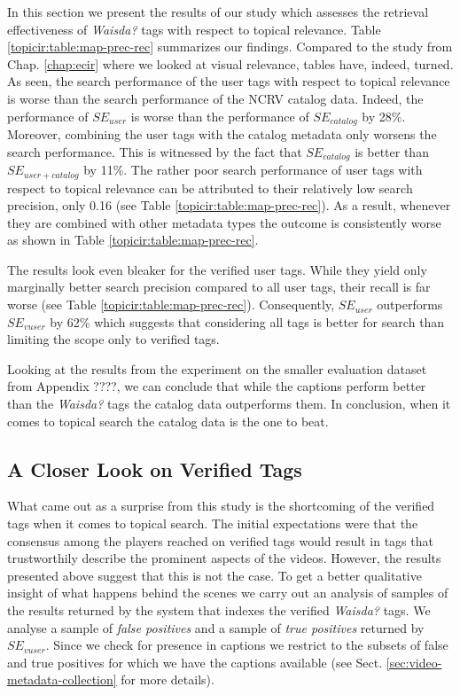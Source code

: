 In this section we present the results of our study which assesses the retrieval effectiveness of \textit{Waisda?} tags with respect to topical relevance. Table \ref{topicir:table:map-prec-rec} summarizes our findings. Compared to the study from Chap. \ref{chap:ecir} where we looked at visual relevance, tables have, indeed, turned. As seen, the search performance of the user tags with respect to topical relevance is  worse than the search performance of the NCRV catalog data. Indeed, the performance of $SE_{user}$ is worse than the performance of $SE_{catalog}$ by 28\%. Moreover, combining the user tags with the catalog metadata only worsens the search performance. This is witnessed by the fact that $SE_{catalog}$ is better than $SE_{user+catalog}$ by 11\%. 
The rather poor search performance of user tags with respect to topical relevance can be attributed to their relatively low search precision, only 0.16 (see Table \ref{topicir:table:map-prec-rec}). As a result, whenever they are combined with other metadata types the outcome is consistently worse as shown in Table \ref{topicir:table:map-prec-rec}.

The results look even bleaker for the verified user tags. While they yield only marginally better search precision compared to all user tags, their recall is far worse (see Table \ref{topicir:table:map-prec-rec}). Consequently, $SE_{user}$ outperforms $SE_{vuser}$ by 62\% which suggests that considering all tags is better for search than limiting the scope only to verified tags.

Looking at the results from the experiment on the smaller evaluation dataset from Appendix ????, we can conclude that while the captions perform better than the \textit{Waisda?} tags the catalog data outperforms them. In conclusion, when it comes to topical search the catalog data is the one to beat.

\subsection{A Closer Look on Verified Tags}\label{topicir:qual-ana}
What came out as a surprise from this study is the shortcoming of the verified tags when it comes to topical search. The initial expectations were that the consensus among the players reached on verified tags would result in tags that trustworthily describe the prominent aspects of the videos. However, the results presented above suggest that this is not the case.  To get a better qualitative insight of what happens behind the scenes we carry out an analysis of samples of the results returned by the system that indexes the verified \textit{Waisda?} tags. We analyse a sample of \textit{false positives} and a sample of \textit{true positives} returned by $SE_{vuser}$. Since we check for presence in captions we restrict to the subsets of false and true positives for which we have the captions available (see Sect. \ref{sec:video-metadata-collection} for more details).

